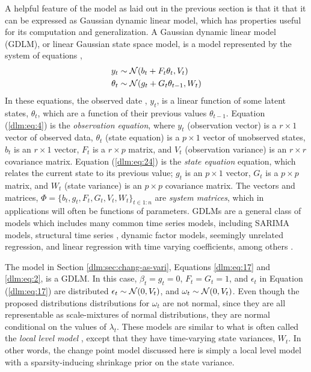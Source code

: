 A helpful feature of the model as laid out in the previous section is that it that it can be expressed as Gaussian dynamic linear model, which has properties useful for its computation and generalization.
A Gaussian dynamic linear model (GDLM), or linear Gaussian state space model, is a model represented by the system of equations \parencites{DurbinKoopman2012}{WestHarrison1997}{PetrisPetroneEtAl2009}[Ch 6]{ShumwayStoffer2010},
\begin{align}
  \label{dlm:eq:4}
  y_{t} &\sim \mathcal{N}\mathopen{}\left(b_{t} + F_{t} \theta_{t}, V_{t}\right)\mathclose{} \\
  \label{dlm:eq:24}
  \theta_{t} &\sim \mathcal{N}\mathopen{}\left(g_{t} + G_{t} \theta_{t - 1}, W_{t}\right)\mathclose{} 
\end{align}
In these equations, the observed date , $y_{t}$, is a linear function of some latent states, $\theta_{t}$, which are a function of their previous values $\theta_{t-1}$.
Equation (\ref{dlm:eq:4}) is the \textit{observation equation}, where $y_{t}$ (observation vector) is a $r \times 1$ vector of observed data, $\theta_{t}$ (state equation) is a $p \times 1$ vector of unobserved states, $b_{t}$ is an $r \times 1$ vector, $F_{t}$ is a $r \times p$ matrix, and $V_{t}$ (observation variance) is an $r \times r$ covariance matrix.
Equation (\ref{dlm:eq:24}) is the \textit{state equation} equation, which relates the current state to its previous value; $g_{t}$ is an $p \times 1$ vector, $G_{t}$ is a $p \times p$ matrix, and $W_{t}$ (state variance) is an $p \times p$ covariance matrix.
The vectors and matrices, $\Phi = \{ b_{t}, g_{t}, F_{t}, G_{t}, V_{t}, W_{t} \}_{t \in 1:n}$ are \textit{system matrices}, which in applications will often be functions of parameters.
GDLMs are a general class of models which includes many common time series models, including SARIMA models, structural time series \parencite{Harvey1990}, dynamic factor models, seemingly unrelated regression, and linear regression with time varying coefficients, among others \parencite[Ch. 3]{DurbinKoopman2012}. 

The model in Section \ref{dlm:sec:chang-as-vari}, Equations \eqref{dlm:eq:17} and \eqref{dlm:eq:2}, is a GDLM.
In this case, $\beta_{t} = g_{t} = 0$, $F_{t} = G_{t} = 1$, and $\epsilon_{t}$ in Equation (\ref{dlm:eq:17}) are distributed $\epsilon_{t} \sim \mathcal{N}\mathopen{}\left(0, V_{t}\right)\mathclose{}$, and $\omega_{t} \sim \mathcal{N}\mathopen{}\left(0, V_{t}\right)\mathclose{}$.
Even though the proposed distributions distributions for $\omega_{t}$ are not normal, since they are all representable as scale-mixtures of normal distributions, they are normal conditional on the values of $\lambda_{t}$.%
These models are similar to what is often called the \textit{local level model} \parencite[Ch 2.]{DurbinKoopman2012}, except that they have time-varying state variances, $W_{t}$.
In other words, the change point model discussed here is simply a local level model with a sparsity-inducing shrinkage prior on the state variance.

